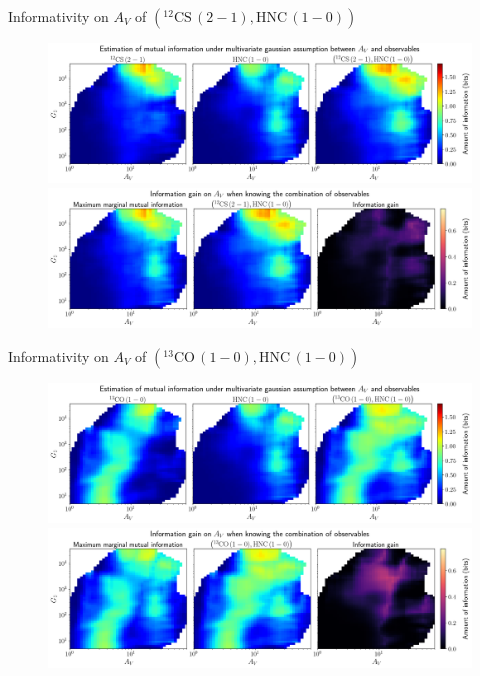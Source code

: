 \documentclass{beamer}
\begin{document}
\begin{frame}{Informativity on $A_V$ of $\left(\mathrm{^{12}CS\,(2-1)},\mathrm{HNC\,(1-0)}\right)$}
    \begin{figure}
        \centering
        \includegraphics[width=0.95\linewidth]{../linearinfo/av__12cs21_hnc10_linearinfo.png}
        \vfill
        \includegraphics[width=0.95\linewidth]{../linearinfo/av__12cs21_hnc10_linearinfo_gain.png}
    \end{figure}
\end{frame}

\begin{frame}{Informativity on $A_V$ of $\left(\mathrm{^{13}CO\,(1-0)},\mathrm{HNC\,(1-0)}\right)$}
    \begin{figure}
        \centering
        \includegraphics[width=0.95\linewidth]{../linearinfo/av__13co10_hnc10_linearinfo.png}
        \vfill
        \includegraphics[width=0.95\linewidth]{../linearinfo/av__13co10_hnc10_linearinfo_gain.png}
    \end{figure}
\end{frame}
\end{document}
